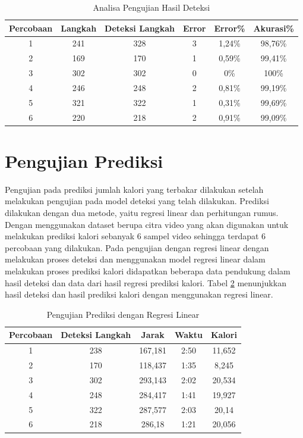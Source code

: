 \begin{longtable}{|c|c|c|c|c|c|}
  \caption{Analisa Pengujian Hasil Deteksi}
  \label{tb:AnalisaDeteksi}                                   \\
  \hline
  \rowcolor[HTML]{C0C0C0}
  \textbf{Percobaan} & \textbf{Langkah} & \textbf{Deteksi Langkah} & \textbf{Error} & \textbf{Error\%} & \textbf{Akurasi\%} \\
  \hline
  1   & 241   & 328 & 3   & 1,24\%    & 98,76\%   \\
  \hline
  2   & 169   & 170 & 1   & 0,59\%    & 99,41\%   \\
  \hline
  3   & 302   & 302 & 0   & 0\%       & 100\%     \\
  \hline
  4   & 246   & 248 & 2   & 0,81\%    & 99,19\%   \\
  \hline
  5   & 321   & 322 & 1   & 0,31\%    & 99,69\%   \\
  \hline
  6   & 220   & 218 & 2   & 0,91\%    & 99,09\%   \\
  \hline
\end{longtable}


\section{Pengujian Prediksi}
\label{sec:PengujianPrediksi}

Pengujian pada prediksi jumlah kalori yang terbakar dilakukan setelah melakukan pengujian pada model deteksi yang telah dilakukan. Prediksi dilakukan dengan dua metode, yaitu regresi linear dan perhitungan rumus. Dengan menggunakan dataset berupa citra video yang akan digunakan untuk melakukan prediksi kalori sebanyak 6 sampel video sehingga terdapat 6 percobaan yang dilakukan. Pada pengujian dengan regresi linear dengan melakukan proses deteksi dan menggunakan model regresi linear dalam melakukan proses prediksi kalori didapatkan beberapa data pendukung dalam hasil deteksi dan data dari hasil regresi prediksi kalori. Tabel \ref{tb:PengujianPrediksiRegresi} menunjukkan hasil deteksi dan hasil prediksi kalori dengan menggunakan regresi linear.

\begin{longtable}{|c|c|c|c|c|}
  \caption{Pengujian Prediksi dengan Regresi Linear}
  \label{tb:PengujianPrediksiRegresi}                                   \\
  \hline
  \rowcolor[HTML]{C0C0C0}
  \textbf{Percobaan} & \textbf{Deteksi Langkah} & \textbf{Jarak} & \textbf{Waktu} & \textbf{Kalori} \\
  \hline
  1   & 238   & 167,181    & 2:50    & 11,652  \\
  \hline
  2   & 170   & 118,437    & 1:35    & 8,245   \\
  \hline
  3   & 302   & 293,143    & 2:02    & 20,534  \\
  \hline
  4   & 248   & 284,417    & 1:41    & 19,927  \\
  \hline
  5   & 322   & 287,577    & 2:03    & 20,14   \\
  \hline
  6   & 218   & 286,18     & 1:21    & 20,056  \\
  \hline
\end{longtable}


